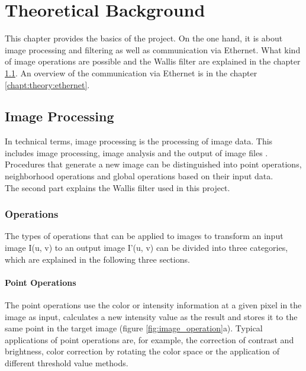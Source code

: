 %
%
\chapter{Theoretical Background} \label{chapt:theoreticalback}
This chapter provides the basics of the project. On the one hand, it is about image processing and filtering as well as communication via Ethernet. What kind of image operations are possible and the Wallis filter are explained in the chapter \ref{chapt:theory:imageprocessing}. An overview of the communication via Ethernet is in the chapter \ref{chapt:theory:ethernet}.


%
%
\section{Image Processing} \label{chapt:theory:imageprocessing}
In technical terms, image processing is the processing of image data. This includes image processing, image analysis and the output of image files \cite{image_processing}. Procedures that generate a new image can be distinguished into point operations, neighborhood operations and global operations based on their input data. \\
The second part explains the Wallis filter used in this project.

\subsection{Operations}
The types of operations that can be applied to images to transform an input image I(u, v) to an output image I'(u, v) can be divided into three categories, which are explained in the following three sections.

\subsubsection*{Point Operations}
The point operations use the color or intensity information at a given pixel in the image as input, calculates a new intensity value as the result and stores it to the same point in the target image (figure \ref{fig:image_operation}a). Typical applications of point operations are, for example, the correction of contrast and brightness, color correction by rotating the color space or the application of different threshold value methods.

